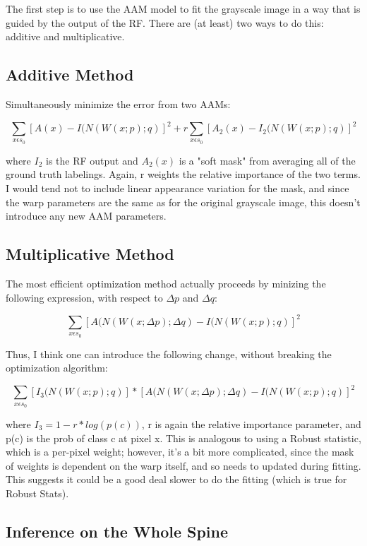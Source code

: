\documentclass[10pt,twocolumn,letterpaper]{article}
\begin{document}
The first step is to use the AAM model to fit the grayscale image in a way that is guided by the output of the RF.  There are (at least) two ways to do this: additive and multiplicative.

\subsection{Additive Method}

Simultaneously minimize the error from two AAMs:

\[ \sum_{x \epsilon s_0} [A(x) - I(N(W(x;p);q)]^2 + r\sum_{x \epsilon s_0} [A_2(x) - I_2(N(W(x;p);q)]^2 \]

where $I_2$ is the RF output and $A_2(x)$ is a "soft mask" from averaging all of the ground truth labelings.  Again, r weights the relative importance of the two terms.  I would tend not to include linear appearance variation for the mask, and since the warp parameters are the same as for the original grayscale image, this doesn't introduce any new AAM parameters.

\subsection{Multiplicative Method}

The most efficient optimization method actually proceeds by minizing the following expression, with respect to $\Delta p$ and $\Delta q$:

\[ \sum_{x \epsilon s_0} [A(N(W(x;\Delta p);\Delta q) - I(N(W(x;p);q)]^2 \]

Thus, I think one can introduce the following change, without breaking the optimization algorithm:

\[ \sum_{x \epsilon s_0} [I_3(N(W(x;p);q)]*[A(N(W(x;\Delta p);\Delta q) - I(N(W(x;p);q)]^2 \]

where $I_3 = 1 - r*log(p(c))$, r is again the relative importance parameter, and p(c) is the prob of class c at pixel x.  This is analogous to using a Robust statistic, which is a per-pixel weight; however, it's a bit more complicated, since the mask of weights is dependent on the warp itself, and so needs to updated during fitting.  This suggests it could be a good deal slower to do the fitting (which is true for Robust Stats).

\subsection{Inference on the Whole Spine}
\end{document}
